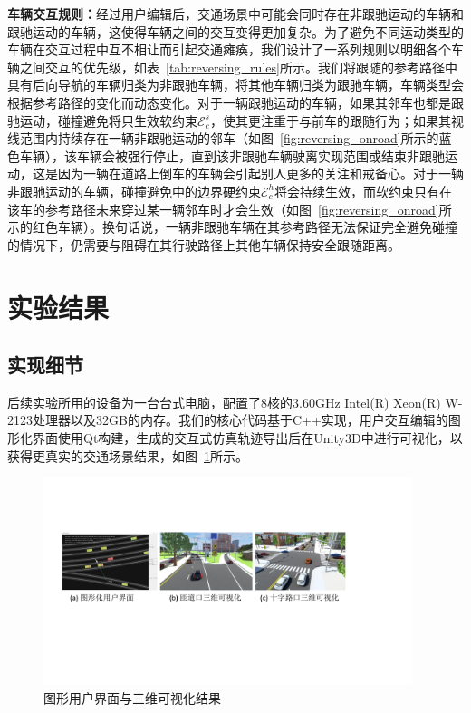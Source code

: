 \textbf{车辆交互规则：}经过用户编辑后，交通场景中可能会同时存在非跟驰运动的车辆和跟驰运动的车辆，这使得车辆之间的交互变得更加复杂。为了避免不同运动类型的车辆在交互过程中互不相让而引起交通瘫痪，我们设计了一系列规则以明细各个车辆之间交互的优先级，如表~\ref{tab:reversing_rules}所示。我们将跟随的参考路径中具有后向导航的车辆归类为非跟驰车辆，将其他车辆归类为跟驰车辆，车辆类型会根据参考路径的变化而动态变化。对于一辆跟驰运动的车辆，如果其邻车也都是跟驰运动，碰撞避免将只生效软约束$\mathcal{E}^{s}_{c}$，使其更注重于与前车的跟随行为；如果其视线范围内持续存在一辆非跟驰运动的邻车（如图~\ref{fig:reversing_onroad}所示的蓝色车辆），该车辆会被强行停止，直到该非跟驰车辆驶离实现范围或结束非跟驰运动，这是因为一辆在道路上倒车的车辆会引起别人更多的关注和戒备心。对于一辆非跟驰运动的车辆，碰撞避免中的边界硬约束$\mathcal{E}^{h}_{c}$将会持续生效，而软约束只有在该车的参考路径未来穿过某一辆邻车时才会生效（如图~\ref{fig:reversing_onroad}所示的红色车辆）。换句话说，一辆非跟驰车辆在其参考路径无法保证完全避免碰撞的情况下，仍需要与阻碍在其行驶路径上其他车辆保持安全跟随距离。



\section{实验结果}

\subsection{实现细节}

后续实验所用的设备为一台台式电脑，配置了8核的3.60GHz Intel(R) Xeon(R) W-2123处理器以及32GB的内存。我们的核心代码基于C++实现，用户交互编辑的图形化界面使用Qt构建，生成的交互式仿真轨迹导出后在Unity3D中进行可视化，以获得更真实的交通场景结果，如图~\ref{fig:reversing_gui}所示。

\begin{figure}[!tbh]
\centering
\includegraphics[width=0.96\textwidth]{figure/reversing/gui v3.pdf}
\caption[图形用户界面与三维可视化结果]{
图形用户界面与三维可视化结果
}
\label{fig:reversing_gui}
\end{figure}

